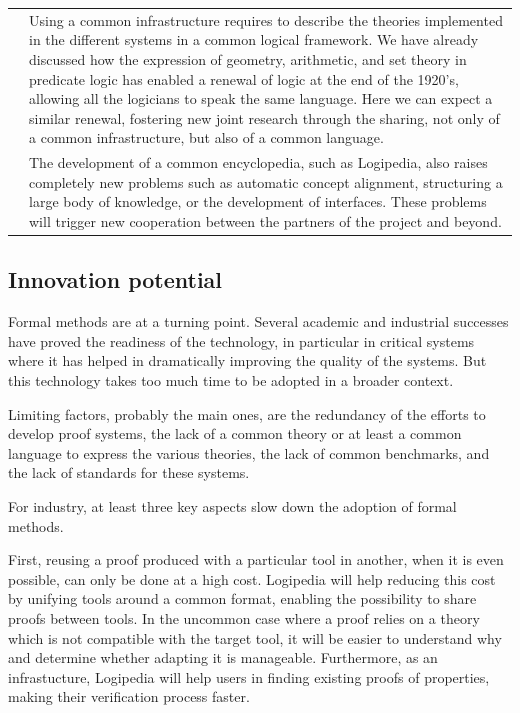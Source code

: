 \begin{longtable}{|p{}|p{}|}
&
\hspace{0.4cm}
Using a common infrastructure requires
to describe the theories implemented in the different systems in a
common logical framework. We have already discussed how the expression
of geometry, arithmetic, and set theory in predicate logic has
enabled a renewal of logic at the end of the 1920's, allowing all
the logicians to speak the same language. Here we can expect a similar
renewal, fostering new joint research through the sharing, not
only of a common infrastructure, but also of a common language.\\
&
\hspace{0.4cm}
The development of a common encyclopedia, such as Logipedia, also
raises completely new problems such as automatic concept alignment,
structuring a large body of knowledge, or the development of
interfaces. These problems will trigger new cooperation between the
partners of the project and beyond.\\
\hline
\end{longtable}

\subsection*{Innovation potential}

Formal methods are at a turning point. Several academic and
industrial successes have proved the readiness of the technology,
in particular in critical systems where it has helped in
dramatically improving the quality of the systems. But this
technology takes too much time to be adopted in a broader context.

Limiting factors, probably the main ones, are the redundancy of the
efforts to develop proof systems, the lack of a common theory or at
least a common language to express the various theories, the lack of
common benchmarks, and the lack of standards for these systems.

For industry, at least three key aspects slow down the adoption of
formal methods.

First, reusing a proof produced with a particular tool in another, 
when it is even possible, can only be done at a high cost.
Logipedia will help reducing this cost by unifying tools
around a common format, enabling the possibility to share proofs
between tools. In the uncommon case where a proof relies on a theory
which is not compatible with the target tool, it will be easier to
understand why and determine whether adapting it is manageable.
Furthermore, as an infrastucture, Logipedia will help users
in finding existing proofs of properties, making their verification
process faster.

